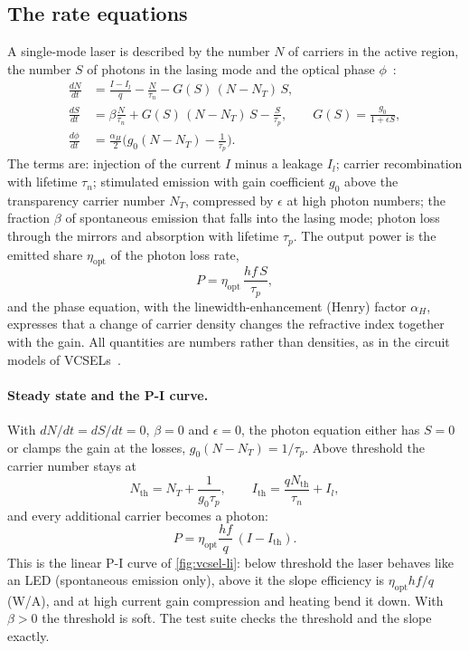 \subsection{The rate equations}
A single-mode laser is described by the number $N$ of carriers in the active region, the number
$S$ of photons in the lasing mode and the optical phase $\phi$~\cite{coldren2012}:
\begin{align}
  \frac{dN}{dt}&=\frac{I-I_l}{q}-\frac{N}{\tau_n}-G(S)\,(N-N_T)\,S,\\
  \frac{dS}{dt}&=\beta\frac{N}{\tau_n}+G(S)\,(N-N_T)\,S-\frac{S}{\tau_p},\qquad G(S)=\frac{g_0}{1+\epsilon S},\\
  \frac{d\phi}{dt}&=\frac{\alpha_H}{2}\Big(g_0(N-N_T)-\frac1{\tau_p}\Big).
  \label{eq:rate}
\end{align}
The terms are: injection of the current $I$ minus a leakage $I_l$; carrier recombination with
lifetime $\tau_n$; stimulated emission with gain coefficient $g_0$ above the transparency carrier
number $N_T$, compressed by $\epsilon$ at high photon numbers; the fraction $\beta$ of spontaneous
emission that falls into the lasing mode; photon loss through the mirrors and absorption with
lifetime $\tau_p$. The output power is the emitted share $\eta_{\mathrm{opt}}$ of the photon loss rate,
\begin{equation}
  P=\eta_{\mathrm{opt}}\,\frac{hf\,S}{\tau_p},
\end{equation}
and the phase equation, with the linewidth-enhancement (Henry) factor $\alpha_H$, expresses that a
change of carrier density changes the refractive index together with the gain. All quantities are
numbers rather than densities, as in the circuit models of
VCSELs~\cite{mena1999,shi2009}.

\paragraph{Steady state and the P-I curve.} With $dN/dt=dS/dt=0$, $\beta=0$ and $\epsilon=0$, the
photon equation either has $S=0$ or clamps the gain at the losses, $g_0(N-N_T)=1/\tau_p$. Above
threshold the carrier number stays at
\begin{equation}
  N_{\mathrm{th}}=N_T+\frac1{g_0\tau_p},\qquad I_{\mathrm{th}}=\frac{qN_{\mathrm{th}}}{\tau_n}+I_l,
\end{equation}
and every additional carrier becomes a photon:
\begin{equation}
  P=\eta_{\mathrm{opt}}\frac{hf}{q}\,(I-I_{\mathrm{th}}).
\end{equation}
This is the linear P-I curve of \cref{fig:vcsel-li}: below threshold the laser behaves like an LED
(spontaneous emission only), above it the slope efficiency is $\eta_{\mathrm{opt}}hf/q$ (W/A), and at high
current gain compression and heating bend it down. With $\beta>0$ the threshold is soft. The test
suite checks the threshold and the slope exactly.


